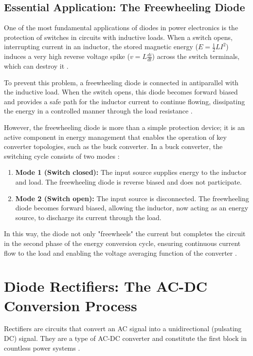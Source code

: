 \documentclass[12pt,a4paper]{article}
\begin{document}
\subsection{Essential Application: The Freewheeling Diode}

One of the most fundamental applications of diodes in power electronics is the protection of switches in circuits with inductive loads. When a switch opens, interrupting current in an inductor, the stored magnetic energy ($E = \frac{1}{2}LI^2$) induces a very high reverse voltage spike ($v = L \frac{di}{dt}$) across the switch terminals, which can destroy it \cite{rashid2014}.

To prevent this problem, a freewheeling diode is connected in antiparallel with the inductive load. When the switch opens, this diode becomes forward biased and provides a safe path for the inductor current to continue flowing, dissipating the energy in a controlled manner through the load resistance \cite{rashid2014}.

However, the freewheeling diode is more than a simple protection device; it is an active component in energy management that enables the operation of key converter topologies, such as the buck converter. In a buck converter, the switching cycle consists of two modes \cite{rashid2014}:

\begin{enumerate}
    \item \textbf{Mode 1 (Switch closed):} The input source supplies energy to the inductor and load. The freewheeling diode is reverse biased and does not participate.
    \item \textbf{Mode 2 (Switch open):} The input source is disconnected. The freewheeling diode becomes forward biased, allowing the inductor, now acting as an energy source, to discharge its current through the load.
\end{enumerate}

In this way, the diode not only "freewheels" the current but completes the circuit in the second phase of the energy conversion cycle, ensuring continuous current flow to the load and enabling the voltage averaging function of the converter \cite{rashid2014}.

\section{Diode Rectifiers: The AC-DC Conversion Process}

Rectifiers are circuits that convert an AC signal into a unidirectional (pulsating DC) signal. They are a type of AC-DC converter and constitute the first block in countless power systems \cite{rashid2014, mohan2003}.
\end{document}
